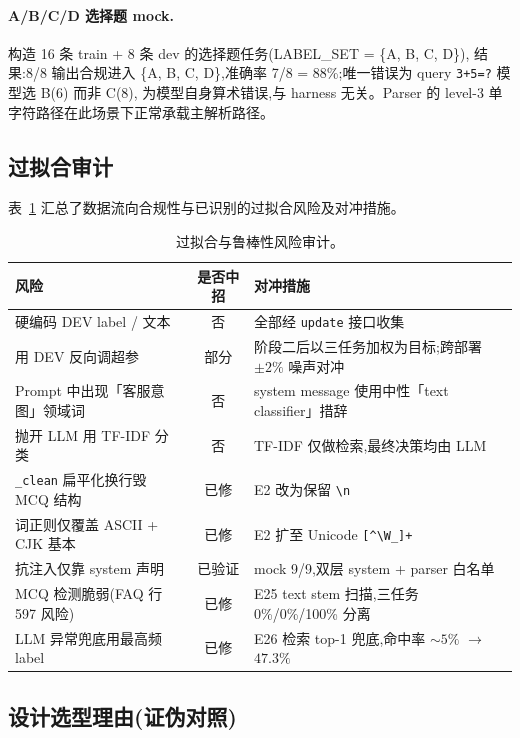 \documentclass[11pt,a4paper]{ctexart}
\begin{document}
\paragraph{A/B/C/D 选择题 mock.}构造 16 条 train + 8 条 dev 的选择题任务(LABEL\_SET = \{A, B, C, D\}),
结果:8/8 输出合规进入 \{A, B, C, D\},准确率 7/8 = 88\%;唯一错误为 query \texttt{3+5=?} 模型选 B(6) 而非 C(8),
为模型自身算术错误,与 harness 无关。Parser 的 level-3 单字符路径在此场景下正常承载主解析路径。

\subsection{过拟合审计}

表~\ref{tab:overfit} 汇总了数据流向合规性与已识别的过拟合风险及对冲措施。

\begin{table}[h]
\centering
\small
\renewcommand{\arraystretch}{1.25}
\begin{tabularx}{\linewidth}{@{}XcX@{}}
\toprule
\textbf{风险} & \textbf{是否中招} & \textbf{对冲措施} \\
\midrule
硬编码 DEV label / 文本              & 否      & 全部经 \texttt{update} 接口收集 \\
用 DEV 反向调超参                    & 部分    & 阶段二后以三任务加权为目标;跨部署 $\pm 2\%$ 噪声对冲 \\
Prompt 中出现「客服意图」领域词        & 否      & system message 使用中性「text classifier」措辞 \\
抛开 LLM 用 TF-IDF 分类              & 否      & TF-IDF 仅做检索,最终决策均由 LLM \\
\texttt{\_clean} 扁平化换行毁 MCQ 结构 & 已修    & E2 改为保留 \texttt{\textbackslash n} \\
词正则仅覆盖 ASCII + CJK 基本         & 已修    & E2 扩至 Unicode \texttt{[\^{}\textbackslash W\_]+} \\
抗注入仅靠 system 声明                & 已验证  & mock 9/9,双层 system + parser 白名单 \\
MCQ 检测脆弱(FAQ 行 597 风险)       & 已修    & E25 text stem 扫描,三任务 0\%/0\%/100\% 分离 \\
LLM 异常兜底用最高频 label            & 已修    & E26 检索 top-1 兜底,命中率 $\sim 5\%$ $\to$ $47.3\%$ \\
\bottomrule
\end{tabularx}
\caption{过拟合与鲁棒性风险审计。}
\label{tab:overfit}
\end{table}

\subsection{设计选型理由(证伪对照)}
\end{document}
